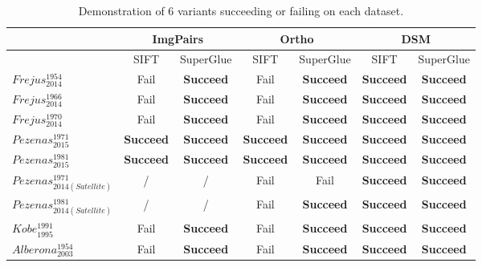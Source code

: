 \begin{table}[htbp]
	\centering
	\begin{tabular}{||l|c|c|c|c|c|c||}\hline
		&\multicolumn{2}{c|}{ImgPairs} &\multicolumn{2}{c|}{Ortho} &\multicolumn{2}{c|}{\ac{DSM}}\\\hline
		& SIFT & SuperGlue & SIFT & SuperGlue & SIFT & SuperGlue \\\hline\hline
		$Frejus_{2014}^{1954}$ &  Fail  &  \textbf{Succeed}  &  Fail  &  \textbf{Succeed}  &  \textbf{Succeed}  &  \textbf{Succeed} \\
		$Frejus_{2014}^{1966}$ &  Fail  &  \textbf{Succeed}  &  Fail  &  \textbf{Succeed}  &  \textbf{Succeed}  &  \textbf{Succeed} \\
		$Frejus_{2014}^{1970}$ &  Fail  &  \textbf{Succeed}  &  Fail  &  \textbf{Succeed}  &  \textbf{Succeed}  &  \textbf{Succeed} \\\hline
		$Pezenas_{2015}^{1971}$ &  \textbf{Succeed}  &  \textbf{Succeed}  &  \textbf{Succeed}  &  \textbf{Succeed}  &  \textbf{Succeed}  &  \textbf{Succeed} \\
		$Pezenas_{2015}^{1981}$ &  \textbf{Succeed}  &  \textbf{Succeed}  &  \textbf{Succeed}  &  \textbf{Succeed}  &  \textbf{Succeed}  &  \textbf{Succeed} \\\hline
		$Pezenas_{2014(Satellite)}^{1971}$ & / & / &  Fail  &  Fail  &  \textbf{Succeed}  &  \textbf{Succeed} \\
		$Pezenas_{2014(Satellite)}^{1981}$ & / & / &  Fail  &  \textbf{Succeed}  &  \textbf{Succeed}  &  \textbf{Succeed} \\\hline
		$Kobe_{1995}^{1991}$ &  Fail  &  \textbf{Succeed}  &  Fail  &  \textbf{Succeed}  &  \textbf{Succeed}  &  \textbf{Succeed} \\\hline
		$Alberona_{2003}^{1954}$ &  Fail  &  \textbf{Succeed}  &  Fail  &  \textbf{Succeed}  &  \textbf{Succeed}  &  \textbf{Succeed} \\\hline
	\end{tabular}
	\caption{Demonstration of 6 variants succeeding or failing on each dataset.}
	\label{succeedorfail}
\end{table}


